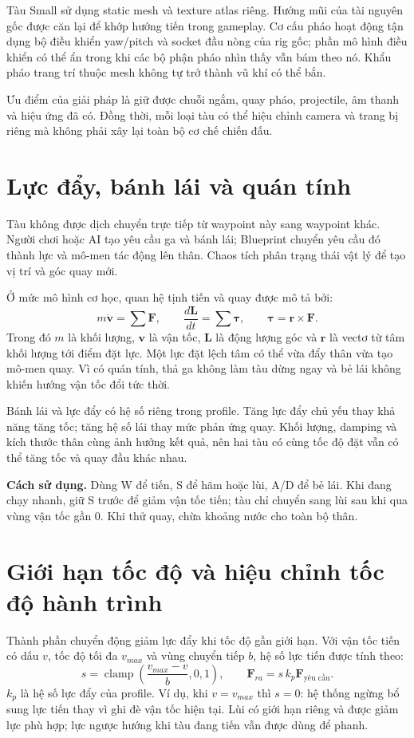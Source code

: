\documentclass[11pt,a4paper,oneside]{report}
\newcommand{\howto}[1]{\par\smallskip\noindent\textbf{Cách sử dụng.} #1\par}
\begin{document}
Tàu Small sử dụng static mesh và texture atlas riêng. Hướng mũi của tài nguyên gốc được căn lại để khớp hướng tiến trong gameplay. Cơ cấu pháo hoạt động tận dụng bộ điều khiển yaw/pitch và socket đầu nòng của rig gốc; phần mô hình điều khiển có thể ẩn trong khi các bộ phận pháo nhìn thấy vẫn bám theo nó. Khẩu pháo trang trí thuộc mesh không tự trở thành vũ khí có thể bắn.

Ưu điểm của giải pháp là giữ được chuỗi ngắm, quay pháo, projectile, âm thanh và hiệu ứng đã có. Đồng thời, mỗi loại tàu có thể hiệu chỉnh camera và trang bị riêng mà không phải xây lại toàn bộ cơ chế chiến đấu.

\section{Lực đẩy, bánh lái và quán tính}
Tàu không được dịch chuyển trực tiếp từ waypoint này sang waypoint khác. Người chơi hoặc AI tạo yêu cầu ga và bánh lái; Blueprint chuyển yêu cầu đó thành lực và mô-men tác động lên thân. Chaos tích phân trạng thái vật lý để tạo vị trí và góc quay mới.

Ở mức mô hình cơ học, quan hệ tịnh tiến và quay được mô tả bởi:
\begin{equation}
 m\dot{\mathbf v}=\sum\mathbf F,\qquad
 \frac{d\mathbf L}{dt}=\sum\boldsymbol\tau,\qquad
 \boldsymbol\tau=\mathbf r\times\mathbf F.
\end{equation}
Trong đó $m$ là khối lượng, $\mathbf v$ là vận tốc, $\mathbf L$ là động lượng góc và $\mathbf r$ là vectơ từ tâm khối lượng tới điểm đặt lực. Một lực đặt lệch tâm có thể vừa đẩy thân vừa tạo mô-men quay. Vì có quán tính, thả ga không làm tàu dừng ngay và bẻ lái không khiến hướng vận tốc đổi tức thời.

Bánh lái và lực đẩy có hệ số riêng trong profile. Tăng lực đẩy chủ yếu thay khả năng tăng tốc; tăng hệ số lái thay mức phản ứng quay. Khối lượng, damping và kích thước thân cùng ảnh hưởng kết quả, nên hai tàu có cùng tốc độ đặt vẫn có thể tăng tốc và quay đầu khác nhau.
\howto{Dùng W để tiến, S để hãm hoặc lùi, A/D để bẻ lái. Khi đang chạy nhanh, giữ S trước để giảm vận tốc tiến; tàu chỉ chuyển sang lùi sau khi qua vùng vận tốc gần 0. Khi thử quay, chừa khoảng nước cho toàn bộ thân.}

\section{Giới hạn tốc độ và hiệu chỉnh tốc độ hành trình}
Thành phần chuyển động giảm lực đẩy khi tốc độ gần giới hạn. Với vận tốc tiến có dấu $v$, tốc độ tối đa $v_{max}$ và vùng chuyển tiếp $b$, hệ số lực tiến được tính theo:
\begin{equation}
 s=\operatorname{clamp}\left(\frac{v_{max}-v}{b},0,1\right),\qquad
 \mathbf F_{ra}=s\,k_p\mathbf F_{\text{yêu cầu}}.
\end{equation}
$k_p$ là hệ số lực đẩy của profile. Ví dụ, khi $v=v_{max}$ thì $s=0$: hệ thống ngừng bổ sung lực tiến thay vì ghi đè vận tốc hiện tại. Lùi có giới hạn riêng và được giảm lực phù hợp; lực ngược hướng khi tàu đang tiến vẫn được dùng để phanh.
\end{document}
